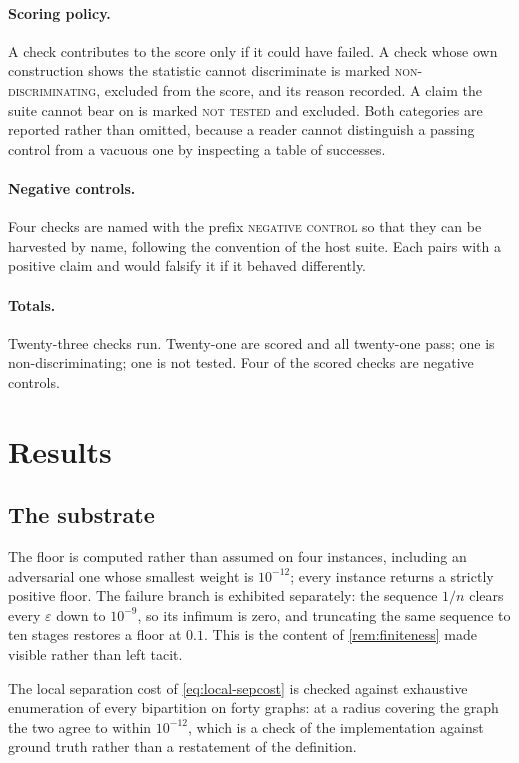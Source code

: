 \documentclass[11pt,twocolumn,a4paper]{article}
\theoremstyle{plain}
\theoremstyle{definition}
\theoremstyle{remark}
\begin{document}
\paragraph{Scoring policy.} A check contributes to the score only if it could
have failed. A check whose own construction shows the statistic cannot
discriminate is marked \textsc{non-discriminating}, excluded from the score,
and its reason recorded. A claim the suite cannot bear on is marked
\textsc{not tested} and excluded. Both categories are reported rather than
omitted, because a reader cannot distinguish a passing control from a vacuous
one by inspecting a table of successes.

\paragraph{Negative controls.} Four checks are named with the prefix
\textsc{negative control} so that they can be harvested by name, following the
convention of the host suite. Each pairs with a positive claim and would
falsify it if it behaved differently.

\paragraph{Totals.} Twenty-three checks run. Twenty-one are scored and all
twenty-one pass; one is non-discriminating; one is not tested. Four of the
scored checks are negative controls.

\section{Results}
\label{sec:results}

\subsection{The substrate}

The floor is computed rather than assumed on four instances, including an
adversarial one whose smallest weight is $10^{-12}$; every instance returns a
strictly positive floor. The failure branch is exhibited separately: the
sequence $1/n$ clears every $\varepsilon$ down to $10^{-9}$, so its infimum is
zero, and truncating the same sequence to ten stages restores a floor at
$0.1$. This is the content of \cref{rem:finiteness} made visible rather than
left tacit.

The local separation cost of \cref{eq:local-sepcost} is checked against
exhaustive enumeration of every bipartition on forty graphs: at a radius
covering the graph the two agree to within $10^{-12}$, which is a check of the
implementation against ground truth rather than a restatement of the
definition.
\end{document}
